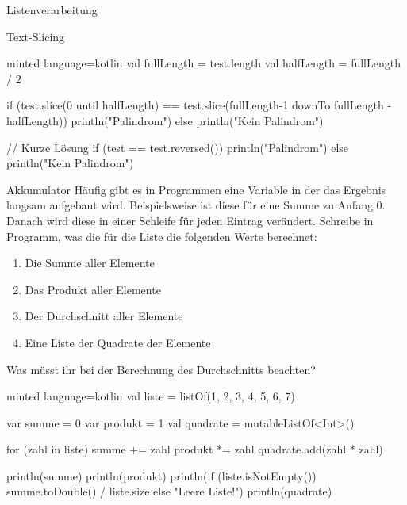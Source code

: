 \begin{task}[points=auto]{Listenverarbeitung}
\begin{subtask*}[points=0]{Text-Slicing }
\begin{solution}
\begin{codeBlock}[]{minted language=kotlin}
                val fullLength = test.length
                val halfLength = fullLength / 2

                if (test.slice(0 until halfLength) == test.slice(fullLength-1 downTo fullLength - halfLength)) {
                    println("Palindrom")
                } else {
                    println("Kein Palindrom")
                }

                // Kurze Lösung
                if (test == test.reversed()) {
                    println("Palindrom")
                } else {
                    println("Kein Palindrom")
                }
            \end{codeBlock}
        \end{solution}
    \end{subtask*}
    \begin{subtask*}[points=0]{Akkumulator }
        Häufig gibt es in Programmen eine Variable in der das Ergebnis langsam aufgebaut
        wird. Beispielsweise ist diese für eine Summe zu Anfang $0$. Danach wird diese
        in einer Schleife für jeden Eintrag verändert. Schreibe in Programm, was die
        für die Liste \kotlininline{[1, 2, 3, 4, 5, 6, 7]} die folgenden Werte berechnet:

        \begin{enumerate}
            \item Die Summe aller Elemente
            \item Das Produkt aller Elemente
            \item Der Durchschnitt aller Elemente
            \item Eine Liste der Quadrate der Elemente
        \end{enumerate}

        Was müsst ihr bei der Berechnung des Durchschnitts beachten?

        \begin{solution}
            \begin{codeBlock}[]{minted language=kotlin}
                val liste = listOf(1, 2, 3, 4, 5, 6, 7)

                var summe = 0
                var produkt = 1
                val quadrate = mutableListOf<Int>()

                for (zahl in liste) {
                    summe += zahl
                    produkt *= zahl
                    quadrate.add(zahl * zahl)
                }

                println(summe)
                println(produkt)
                println(if (liste.isNotEmpty()) summe.toDouble() / liste.size else "Leere Liste!")
                println(quadrate)
            \end{codeBlock}
        \end{solution}
    \end{subtask*}
\end{task}

